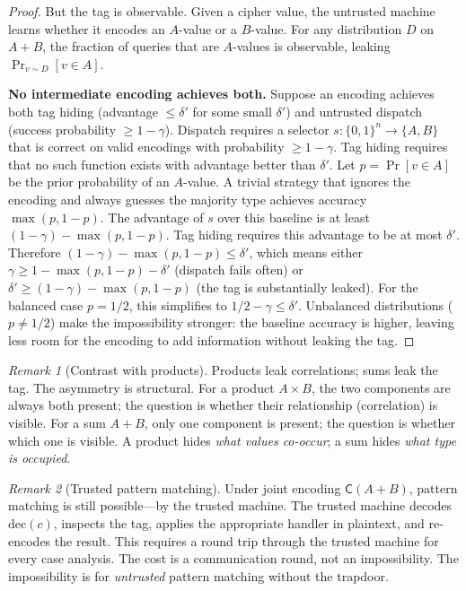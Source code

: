 \documentclass[11pt]{article}
\theoremstyle{definition}
\theoremstyle{plain}
\theoremstyle{remark}
\newtheorem{remark}{Remark}[section]
\newcommand{\dec}{\mathrm{dec}}
\newcommand{\cipher}[1]{\mathsf{C}(#1)}
\newcommand{\B}{\{0,1\}}
\begin{document}
\begin{proof}
But the tag is observable.
Given a cipher value, the untrusted machine learns whether it encodes an
$A$-value or a $B$-value.
For any distribution $D$ on $A + B$, the fraction of queries that are
$A$-values is observable, leaking $\Pr_{v \sim D}[v \in A]$.

\medskip
\noindent\textbf{No intermediate encoding achieves both.}
Suppose an encoding achieves both tag hiding (advantage $\leq \delta'$
for some small $\delta'$) and untrusted dispatch (success
probability $\geq 1 - \gamma$).
Dispatch requires a selector $s : \B^n \to \{A, B\}$ that is
correct on valid encodings with probability $\geq 1 - \gamma$.
Tag hiding requires that no such function exists with advantage better than
$\delta'$.
Let $p = \Pr[v \in A]$ be the prior probability of an $A$-value.
A trivial strategy that ignores the encoding and always guesses the
majority type achieves accuracy $\max(p, 1-p)$.
The advantage of $s$ over this baseline is at least
$(1 - \gamma) - \max(p, 1-p)$.
Tag hiding requires this advantage to be at most $\delta'$.
Therefore $(1-\gamma) - \max(p, 1-p) \leq \delta'$, which means either
$\gamma \geq 1 - \max(p, 1-p) - \delta'$ (dispatch fails often)
or $\delta' \geq (1-\gamma) - \max(p, 1-p)$ (the tag is substantially
leaked).
For the balanced case $p = 1/2$, this simplifies to
$1/2 - \gamma \leq \delta'$.
Unbalanced distributions ($p \neq 1/2$) make the impossibility stronger:
the baseline accuracy is higher, leaving less room for the encoding to
add information without leaking the tag.
\end{proof}

\begin{remark}[Contrast with products]
\label{rem:sum-vs-product}
Products leak correlations; sums leak the tag.
The asymmetry is structural.
For a product $A \times B$, the two components are always both present;
the question is whether their relationship (correlation) is visible.
For a sum $A + B$, only one component is present; the question is whether
which one is visible.
A product hides \emph{what values co-occur}; a sum hides \emph{what type
is occupied}.
\end{remark}

\begin{remark}[Trusted pattern matching]
\label{rem:trusted-matching}
Under joint encoding $\cipher{A+B}$, pattern matching is still possible---by
the trusted machine.
The trusted machine decodes $\dec(c)$, inspects the tag, applies the
appropriate handler in plaintext, and re-encodes the result.
This requires a round trip through the trusted machine for every case
analysis.
The cost is a communication round, not an impossibility.
The impossibility is for \emph{untrusted} pattern matching without the
trapdoor.
\end{remark}
\end{document}
